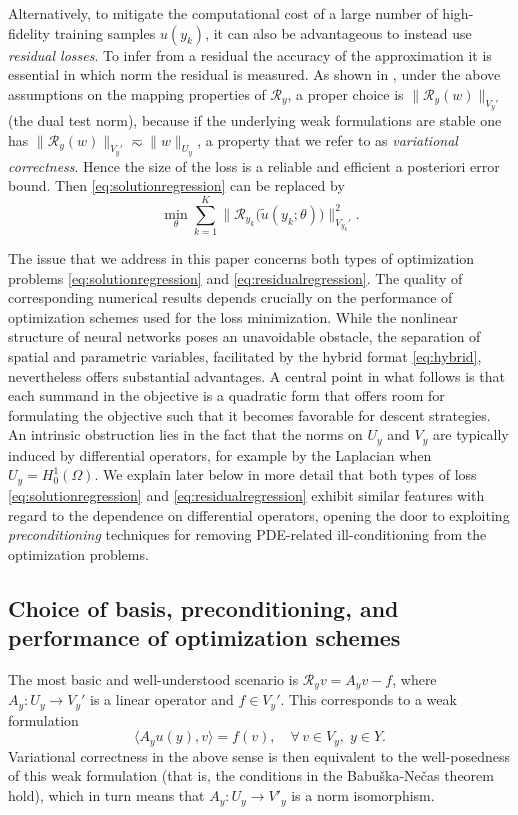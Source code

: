 \documentclass[a4paper,11pt]{amsart}
\providecommand{\norm}[1]{\lVert#1\rVert}
\providecommand{\bignorm}[1]{\bigl\lVert#1\bigr\rVert}
\numberwithin{equation}{section}
\theoremstyle{definition}
\theoremstyle{remark}
\theoremstyle{plain}
\begin{document}
Alternatively, to mitigate the computational cost of a large number of high-fidelity training
samples $u(y_k)$, 
 it can also be advantageous to instead use {\em residual losses}. To infer from a residual the accuracy of the approximation it is essential in which norm the residual
is measured. As shown in \cite{BachmayrDahmenOster2024}, under the above assumptions on the mapping properties of $\mathcal R_y$, a proper choice is $\norm{\mathcal R_y (w)}_{V_y'}$ (the dual test norm), because if the underlying weak formulations are stable one has  $\norm{\mathcal R_y (w)}_{V_y'} \eqsim \norm{ w }_{U_y}$, a property that we refer to as \emph{variational correctness}. Hence the size of the loss is  a reliable and efficient a posteriori error
bound. Then \eqref{eq:solutionregression} can be replaced by
\begin{equation}\label{eq:residualregression}
    \min_\theta \sum_{k=1}^K \bignorm{ \mathcal R_{y_k}\bigl( \tilde u(y_k; \theta) \bigr) }_{V_{y_k}'}^2.
\end{equation}

The issue that we address in this paper concerns both types of optimization problems
\eqref{eq:solutionregression} and \eqref{eq:residualregression}. The quality of corresponding numerical results depends crucially on the performance of optimization schemes used for the loss minimization. While the nonlinear structure of neural networks poses an unavoidable obstacle, the separation of spatial and parametric variables, facilitated by the hybrid format \eqref{eq:hybrid}, nevertheless offers substantial
advantages. A central point in what follows
is that each summand in the objective is a quadratic form that offers room
 for formulating the objective such that it becomes favorable for descent strategies. An intrinsic obstruction lies in the fact that the norms on $U_{y}$ and $V_y$ are typically induced by  differential operators, for example by the Laplacian when $U_{y} = H^1_0(\Omega)$. We explain  later below in more detail that
 both types of loss \eqref{eq:solutionregression} and \eqref{eq:residualregression}
exhibit similar features with regard to the dependence on differential operators,
opening the door to exploiting {\em preconditioning} techniques for removing PDE-related ill-conditioning from the optimization problems.
%
%
%
%
%

\subsection{Choice of basis, preconditioning, and performance of optimization schemes}
%
\newcommand{\cI}{\mathcal{I}}
The most basic and well-understood scenario is $\mathcal R_y v = A_y v - f$, where $A_y\colon U_y \to V_y'$ is a linear operator and $f \in V_y'$. This corresponds to a weak formulation
\[
  \langle A_y u(y) , v\rangle = f(v), \quad \forall \,v \in V_y, \; y \in Y.
\] 
Variational correctness in the above sense is then equivalent to the well-posedness
of this weak formulation (that is, the conditions in the Babu\v{s}ka-Ne\v{c}as theorem hold), which 
in turn means that $A_y : U_y\to V'_y$ is a norm isomorphism. 
\end{document}
